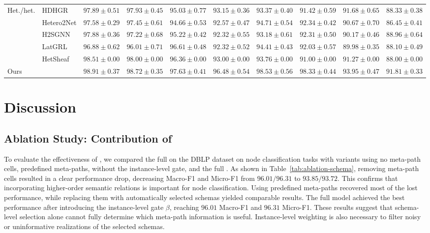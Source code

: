 \begin{table}[t]
{\begin{tabular}{llcccccccc}
    \multirow{5}{*}{Het./het.}
    & HDHGR
    & $97.89 \pm 0.51$ & $97.93 \pm 0.45$
    & $95.03 \pm 0.77$ & $93.15 \pm 0.36$
    & $93.37 \pm 0.40$ & $91.42 \pm 0.59$
    & $91.68 \pm 0.65$ & $88.33 \pm 0.38$ \\
    & Hetero2Net
    & $97.58 \pm 0.29$ & $97.45 \pm 0.61$
    & $94.66 \pm 0.53$ & $92.57 \pm 0.47$
    & $94.71 \pm 0.54$ & $92.34 \pm 0.42$
    & $90.67 \pm 0.70$ & $86.45 \pm 0.41$ \\
    & H2SGNN
    & $97.88 \pm 0.36$ & $97.22 \pm 0.68$
    & $95.22 \pm 0.42$ & $92.32 \pm 0.55$
    & $93.18 \pm 0.61$ & $92.31 \pm 0.50$
    & $90.17 \pm 0.46$ & $88.96 \pm 0.64$ \\
    & LatGRL
    & $96.88 \pm 0.62$ & $96.01 \pm 0.71$
    & $96.61 \pm 0.48$ & $92.32 \pm 0.52$
    & $94.41 \pm 0.43$ & $92.03 \pm 0.57$
    & $89.98 \pm 0.35$ & $88.10 \pm 0.49$ \\
    & HetSheaf
    & $98.51 \pm 0.00$ & $98.00 \pm 0.00$
    & $96.36 \pm 0.00$ & $93.00 \pm 0.00$
    & $93.76 \pm 0.00$ & $91.00 \pm 0.00$
    & $91.27 \pm 0.00$ & $88.00 \pm 0.00$ \\
    \midrule

    Ours
    & \textbf{\method{}}
    & $\mathbf{98.91 \pm 0.37}$ & $\mathbf{98.72 \pm 0.35}$
    & $\mathbf{97.63 \pm 0.41}$ & $\mathbf{96.48 \pm 0.54}$ 
    & $\mathbf{98.53 \pm 0.56}$ & $\mathbf{98.33 \pm 0.44}$
    & $\mathbf{93.95 \pm 0.47}$ & $\mathbf{91.81 \pm 0.33}$  \\
    \bottomrule
  \end{tabular}%
  }
\end{table}

\section{Discussion}
\label{sec:analysis-results}

\subsection{Ablation Study: Contribution of {\ampss{}}}

To evaluate the effectiveness of \ampss{}, we compared the full \method{} on the DBLP dataset on node classification tasks with variants using no
meta-path cells, predefined meta-paths, \ampss{} without the instance-level
gate, and the full \ampss{}. As shown in Table~\ref{tab:ablation-schema}, removing meta-path cells resulted in a clear performance drop, decreasing Macro-F1 and Micro-F1 from $96.01/96.31$ to $93.85/93.72$.
This confirms that incorporating higher-order semantic relations is important for node
classification. Using predefined meta-paths recovered most of the lost performance, while replacing them with
automatically selected schemas yielded comparable results. The full \ampss{} model achieved the
best performance after introducing the instance-level gate $\beta$, reaching $96.01$ Macro-F1
and $96.31$ Micro-F1. These results suggest that schema-level selection alone cannot fully
determine which meta-path information is useful. Instance-level weighting is also necessary to
filter noisy or uninformative realizations of the selected schemas.

